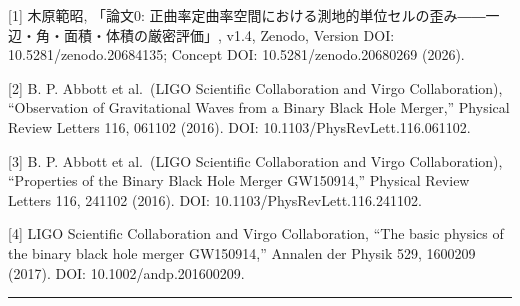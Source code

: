 \documentclass[
  a4paper,
]{ltjsarticle}
\begin{document}
{[}1{]} 木原範昭, 「論文0:
正曲率定曲率空間における測地的単位セルの歪み――一辺・角・面積・体積の厳密評価」,
v1.4, Zenodo, Version DOI: 10.5281/zenodo.20684135; Concept DOI:
10.5281/zenodo.20680269 (2026).

{[}2{]} B. P. Abbott et al.~(LIGO Scientific Collaboration and Virgo
Collaboration), ``Observation of Gravitational Waves from a Binary Black
Hole Merger,'' Physical Review Letters 116, 061102 (2016). DOI:
10.1103/PhysRevLett.116.061102.

{[}3{]} B. P. Abbott et al.~(LIGO Scientific Collaboration and Virgo
Collaboration), ``Properties of the Binary Black Hole Merger GW150914,''
Physical Review Letters 116, 241102 (2016). DOI:
10.1103/PhysRevLett.116.241102.

{[}4{]} LIGO Scientific Collaboration and Virgo Collaboration, ``The
basic physics of the binary black hole merger GW150914,'' Annalen der
Physik 529, 1600209 (2017). DOI: 10.1002/andp.201600209.

\begin{center}\rule{0.5\linewidth}{0.5pt}\end{center}
\end{document}
